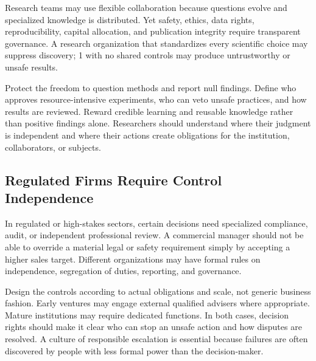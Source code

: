 Research teams may use flexible collaboration because questions evolve and specialized knowledge is distributed. Yet safety, ethics, data rights, reproducibility, capital allocation, and publication integrity require transparent governance. A research organization that standardizes every scientific choice may suppress discovery; 1 with no shared controls may produce untrustworthy or unsafe results.

Protect the freedom to question methods and report null findings. Define who approves resource-intensive experiments, who can veto unsafe practices, and how results are reviewed. Reward credible learning and reusable knowledge rather than positive findings alone. Researchers should understand where their judgment is independent and where their actions create obligations for the institution, collaborators, or subjects.

\subsection{Regulated Firms Require Control Independence}
\label{sec:regulated_firms_control_independence}

In regulated or high-stakes sectors, certain decisions need specialized compliance, audit, or independent professional review. A commercial manager should not be able to override a material legal or safety requirement simply by accepting a higher sales target. Different organizations may have formal rules on independence, segregation of duties, reporting, and governance.

Design the controls according to actual obligations and scale, not generic business fashion. Early ventures may engage external qualified advisers where appropriate. Mature institutions may require dedicated functions. In both cases, decision rights should make it clear who can stop an unsafe action and how disputes are resolved. A culture of responsible escalation is essential because failures are often discovered by people with less formal power than the decision-maker.
